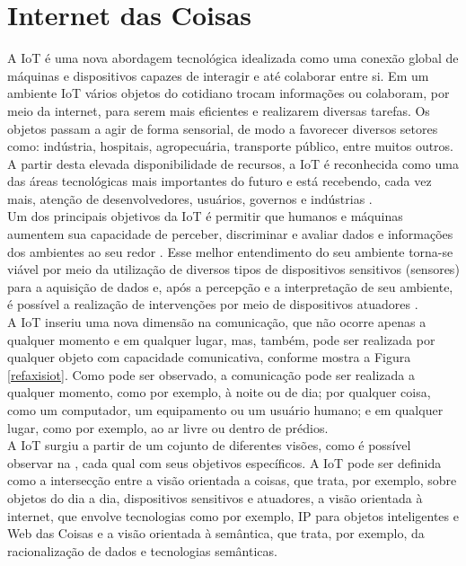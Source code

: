 \section{Internet das Coisas}%
\label{sec:internetofthings}
\quad
A \acrlong{IoT} é uma nova abordagem tecnológica idealizada como uma conexão global
de máquinas e dispositivos capazes de interagir e até colaborar entre si. Em um ambiente \acrshort{IoT} vários objetos do cotidiano trocam informações
ou colaboram, por meio da internet, para serem mais eficientes e realizarem diversas tarefas.
Os objetos passam a agir de forma sensorial, de modo a favorecer diversos setores como:
indústria, hospitais, agropecuária, transporte público, entre muitos outros. A partir desta
elevada disponibilidade de recursos, a \acrshort{IoT} é reconhecida como uma das áreas tecnológicas mais importantes
do futuro e está recebendo, cada vez mais, atenção de desenvolvedores, usuários, governos e indústrias \cite{giusto}.
\\ \null
\quad
Um dos principais objetivos da \acrlong{IoT} é permitir
que humanos e máquinas aumentem sua capacidade de perceber, discriminar e avaliar dados e informações dos ambientes ao seu redor \cite{IOTS}.
 Esse melhor entendimento do seu ambiente torna-se viável por meio da utilização
 de diversos tipos de dispositivos sensitivos (sensores) para a aquisição de dados e, após a percepção e a interpretação
 de seu ambiente, é possível a realização de intervenções por meio de dispositivos atuadores \cite{IOTV}.  \\\null
 \quad A \acrshort{IoT}
 inseriu uma nova dimensão na comunicação, que não ocorre apenas a qualquer momento e em qualquer lugar, mas, também, pode ser realizada por qualquer objeto
 com capacidade comunicativa, conforme mostra a Figura \ref{refaxisiot}. Como pode ser observado, a comunicação pode ser realizada a qualquer momento, como por exemplo, à noite ou de dia; por qualquer coisa, como um computador, um equipamento ou um usuário humano; e em qualquer lugar, como por exemplo, ao ar livre ou dentro de prédios.
\\ \null
 \quad
 A \acrlong{IoT} surgiu a partir de um cojunto de diferentes visões, como é possível observar na  , cada qual com seus objetivos específicos. A \acrshort{IoT} pode ser definida como a intersecção entre a visão orientada a coisas, que trata, por exemplo, sobre objetos do dia a dia, dispositivos sensitivos e atuadores, a visão orientada à internet, que envolve tecnologias como por exemplo, IP para objetos inteligentes e Web das Coisas e a visão orientada à semântica, que trata, por exemplo, da racionalização de dados e tecnologias semânticas.
 \pagebreak
